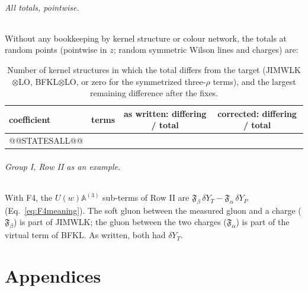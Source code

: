 \documentclass[10pt]{article}
\numberwithin{equation}{section}
\begin{document}
\paragraph{All totals, pointwise.} Without any bookkeeping by kernel structure or colour network, the totals at random points (pointwise in $z$; random symmetric Wilson lines and charges) are:
\begin{table}[H]
\centering\small
\begin{tabular}{@{}l l c c@{}}
coefficient & terms & as written: differing / total & corrected: differing / total\\ \hline
@@STATESALL@@
\end{tabular}
\caption{Number of kernel structures in which the total differs from the target (JIMWLK$\otimes$LO, BFKL$\otimes$LO, or zero for the symmetrized three-$\rho$ terms), and the largest remaining difference after the fixes.}
\label{tab:allstates}
\end{table}

\paragraph{Group I, Row II as an example.} With F4, the $U(w)\mathbb A^{(3)}$ sub-terms of Row II are $\mathfrak F_\beta\,\delta Y_T-\mathfrak F_\alpha\,\delta Y_P$ (Eq.~\eqref{eq:F4meaning}). The soft gluon between the measured gluon and a charge ($\mathfrak F_\beta$) is part of JIMWLK; the gluon between the two charges ($\mathfrak F_\alpha$) is part of the virtual term of BFKL. As written, both had $\delta Y_T$.

\clearpage
\appendix
\part*{Appendices}
\end{document}
